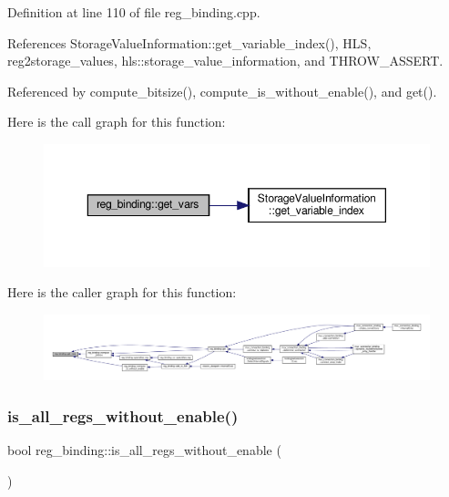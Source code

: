 Definition at line 110 of file reg\+\_\+binding.\+cpp.



References Storage\+Value\+Information\+::get\+\_\+variable\+\_\+index(), H\+LS, reg2storage\+\_\+values, hls\+::storage\+\_\+value\+\_\+information, and T\+H\+R\+O\+W\+\_\+\+A\+S\+S\+E\+RT.



Referenced by compute\+\_\+bitsize(), compute\+\_\+is\+\_\+without\+\_\+enable(), and get().

Here is the call graph for this function\+:
\nopagebreak
\begin{figure}[H]
\begin{center}
\leavevmode
\includegraphics[width=350pt]{da/d7c/classreg__binding_a26f68e6f78394ba39512dc5a519a839e_cgraph}
\end{center}
\end{figure}
Here is the caller graph for this function\+:
\nopagebreak
\begin{figure}[H]
\begin{center}
\leavevmode
\includegraphics[width=350pt]{da/d7c/classreg__binding_a26f68e6f78394ba39512dc5a519a839e_icgraph}
\end{center}
\end{figure}
\mbox{\label{classreg__binding_a5a6584d2dea3c38dce0c7db265bfc2d7}} 
\subsubsection{\texorpdfstring{is\+\_\+all\+\_\+regs\+\_\+without\+\_\+enable()}{is\_all\_regs\_without\_enable()}}
{\footnotesize\ttfamily bool reg\+\_\+binding\+::is\+\_\+all\+\_\+regs\+\_\+without\+\_\+enable (\begin{DoxyParamCaption}{ }\end{DoxyParamCaption})\hspace{0.3cm}{\ttfamily [inline]}}



